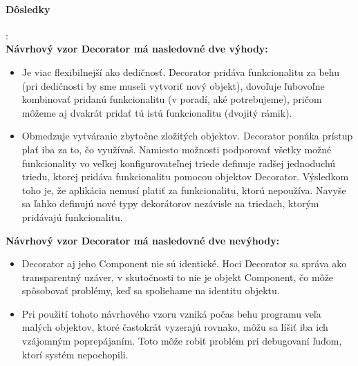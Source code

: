 		\paragraph{Dôsledky}:\\
			\textbf{Návrhový vzor Decorator má nasledovné dve výhody:}
			\begin{itemize}
				\item Je viac flexibilnejší ako dedičnosť. Decorator pridáva funkcionalitu za behu (pri dedičnosti by sme museli vytvoriť nový objekt), dovoľuje ľubovoľne kombinovať pridanú funkcionalitu (v poradí, aké potrebujeme), pričom môžeme aj dvakrát pridať tú istú funkcionalitu (dvojitý rámik).
				\item Obmedzuje vytváranie zbytočne zložitých objektov. Decorator ponúka prístup plať iba za to, čo využívaš. Namiesto možnosti podporovať všetky možné funkcionality vo veľkej konfigurovateľnej triede definuje radšej jednoduchú triedu, ktorej pridáva funkcionalitu pomocou objektov Decorator. Výsledkom toho je, že aplikácia nemusí platiť za funkcionalitu, ktorú nepoužíva. Navyše sa ľahko definujú nové typy dekorátorov nezávisle na triedach, ktorým pridávajú funkcionalitu.
			\end{itemize}

			\textbf{Návrhový vzor Decorator má nasledovné dve nevýhody:}
				\begin{itemize}
					\item Decorator aj jeho Component nie sú identické. Hoci Decorator sa správa ako transparentný uzáver, v skutočnosti to nie je objekt Component, čo môže spôsobovať problémy, keď sa spoliehame na identitu objektu.
					\item Pri použití tohoto návrhového vzoru vzniká počas behu programu veľa malých objektov, ktoré častokrát vyzerajú rovnako, môžu sa líšiť iba ich vzájomným poprepájaním. Toto môže robiť problém pri debugovaní ľuďom, ktorí systém nepochopili.
				\end{itemize}
